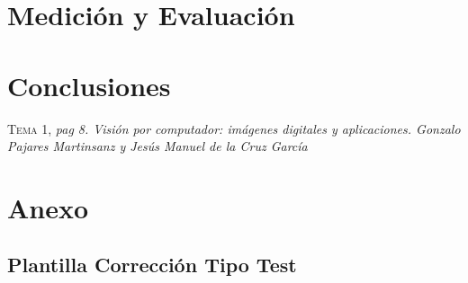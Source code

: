\documentclass[a4paper,11pt]{book}
\begin{document}
\chapter{ Medición y Evaluación}

\chapter{Conclusiones}




\begin{thebibliography}{aaaa}



 \textsc{Tema 1},
\textit{ pag 8. Visión por computador: imágenes digitales y aplicaciones. Gonzalo Pajares Martinsanz y Jesús Manuel de la Cruz García}




\end{thebibliography}

\chapter{ Anexo}

\section{Plantilla Corrección Tipo Test }




%
%
%
%

%
%

\thispagestyle{empty}
\end{document}
